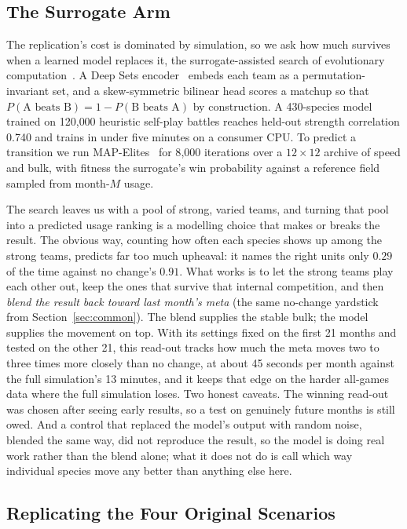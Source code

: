\documentclass[journal]{IEEEtran}
\begin{document}
\subsection{The Surrogate Arm}
\label{sec:surrogate}

The replication's cost is dominated by simulation, so we ask how much
survives when a learned model replaces it, the surrogate-assisted search
of evolutionary computation~\cite{jin2002framework,zhang2022surrogate}. A
Deep Sets
encoder~\cite{zaheer2017deepsets} embeds each team as a permutation-invariant
set, and a skew-symmetric bilinear head scores a matchup so that
$P(\text{A beats B})=1-P(\text{B beats A})$ by construction. A 430-species
model trained on 120{,}000 heuristic self-play battles reaches held-out
strength correlation 0.740 and trains in under five minutes on a consumer
CPU. To predict a transition we run MAP-Elites~\cite{mouret2015illuminating}
for 8{,}000 iterations over a $12\times12$ archive of speed and bulk, with
fitness the surrogate's win probability against a reference field sampled
from month-$M$ usage.

The search leaves us with a pool of strong, varied teams, and turning that
pool into a predicted usage ranking is a modelling choice that makes or
breaks the result. The obvious way, counting how often each species shows up
among the strong teams, predicts far too much upheaval: it names the right
units only $0.29$ of the time against no change's $0.91$. What works is to
let the strong teams play each other out, keep the ones that survive that
internal competition, and then \emph{blend the result back toward last
month's meta} (the same no-change yardstick from Section~\ref{sec:common}).
The blend supplies the stable bulk; the model supplies the movement on top.
With its settings fixed on the first 21 months and tested on the other 21,
this read-out tracks how much the meta moves two to three times more closely
than no change, at about 45 seconds per month against the full simulation's
13 minutes, and it keeps that edge on the harder all-games data where the full
simulation loses. Two honest caveats. The winning read-out was chosen after
seeing early results, so a test on genuinely future months is still owed. And
a control that replaced the model's output with random noise, blended the
same way, did not reproduce the result, so the model is doing real work
rather than the blend alone; what it does not do is call which way individual
species move any better than anything else here.

\subsection{Replicating the Four Original Scenarios}
\label{sec:gen8}
\end{document}

